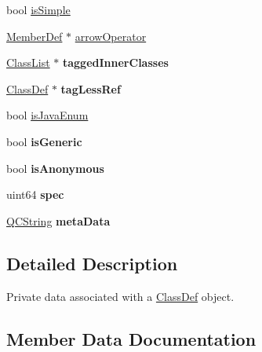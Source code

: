 \begin{DoxyCompactItemize}
\item 
bool \mbox{\hyperlink{class_class_def_impl_a066ef909e009befddbd31341b9ddbb5b}{is\+Simple}}
\item 
\mbox{\hyperlink{class_member_def}{Member\+Def}} $\ast$ \mbox{\hyperlink{class_class_def_impl_a94bc1b4ff18537f707b575ce6e60920c}{arrow\+Operator}}
\item 
\mbox{\label{class_class_def_impl_a8753bef2143ebdef9451738751087e5f}} 
\mbox{\hyperlink{class_class_list}{Class\+List}} $\ast$ {\bfseries tagged\+Inner\+Classes}
\item 
\mbox{\label{class_class_def_impl_a57431554d3d5190b38d8ce18b65f9b09}} 
\mbox{\hyperlink{class_class_def}{Class\+Def}} $\ast$ {\bfseries tag\+Less\+Ref}
\item 
bool \mbox{\hyperlink{class_class_def_impl_a435f18aa29bf28b0723ea7c7fd79b825}{is\+Java\+Enum}}
\item 
\mbox{\label{class_class_def_impl_ad8a4566782b5669e5a77978189900f75}} 
bool {\bfseries is\+Generic}
\item 
\mbox{\label{class_class_def_impl_a65e6446458cf26ce8e39a55a5c111195}} 
bool {\bfseries is\+Anonymous}
\item 
\mbox{\label{class_class_def_impl_a9514ecc09bd2ee98965eb9bc6e0fa787}} 
uint64 {\bfseries spec}
\item 
\mbox{\label{class_class_def_impl_aa9fda54a91fb900237ac929a2828c7de}} 
\mbox{\hyperlink{class_q_c_string}{Q\+C\+String}} {\bfseries meta\+Data}
\end{DoxyCompactItemize}


\subsection{Detailed Description}
Private data associated with a \mbox{\hyperlink{class_class_def}{Class\+Def}} object. 

\subsection{Member Data Documentation}
\mbox{\label{class_class_def_impl_ae645a7a6aceae390224919d15d6df80b}} 
